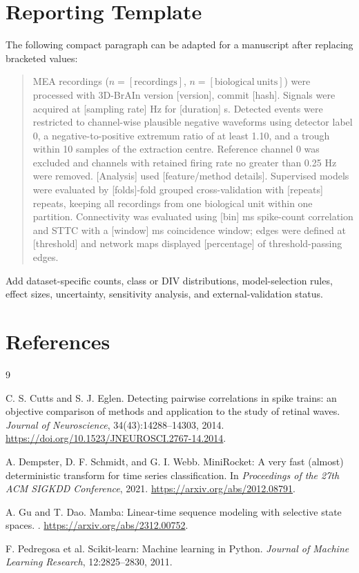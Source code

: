 \documentclass[11pt,a4paper]{article}
\begin{document}
\section{Reporting Template}

The following compact paragraph can be adapted for a manuscript after replacing
bracketed values:

\begin{quote}\small
MEA recordings (\(n=[\mathrm{recordings}]\),
\(n=[\mathrm{biological\ units}]\)) were processed with 3D-BrAIn version
[version], commit [hash]. Signals were acquired at [sampling rate] Hz for
[duration] s. Detected events were restricted to channel-wise plausible
negative waveforms using detector label 0, a negative-to-positive extremum
ratio of at least 1.10, and a trough within 10 samples of the extraction centre.
Reference channel 0 was excluded and channels with retained firing rate no
greater than 0.25 Hz were removed. [Analysis] used [feature/method details].
Supervised models were evaluated by [folds]-fold grouped cross-validation with
[repeats] repeats, keeping all recordings from one biological unit within one
partition. Connectivity was evaluated using [bin] ms spike-count correlation
and STTC with a [window] ms coincidence window; edges were defined at
[threshold] and network maps displayed [percentage] of threshold-passing edges.
\end{quote}

Add dataset-specific counts, class or DIV distributions, model-selection rules,
effect sizes, uncertainty, sensitivity analysis, and external-validation status.

\section{References}

\begin{thebibliography}{9}

C. S. Cutts and S. J. Eglen.
\newblock Detecting pairwise correlations in spike trains: an objective
comparison of methods and application to the study of retinal waves.
\newblock \emph{Journal of Neuroscience}, 34(43):14288--14303, 2014.
\newblock \url{https://doi.org/10.1523/JNEUROSCI.2767-14.2014}.

A. Dempster, D. F. Schmidt, and G. I. Webb.
\newblock MiniRocket: A very fast (almost) deterministic transform for time
series classification.
\newblock In \emph{Proceedings of the 27th ACM SIGKDD Conference}, 2021.
\newblock \url{https://arxiv.org/abs/2012.08791}.

A. Gu and T. Dao.
\newblock Mamba: Linear-time sequence modeling with selective state spaces.
. \url{https://arxiv.org/abs/2312.00752}.

F. Pedregosa et al.
\newblock Scikit-learn: Machine learning in Python.
\newblock \emph{Journal of Machine Learning Research}, 12:2825--2830, 2011.

\end{thebibliography}
\end{document}
